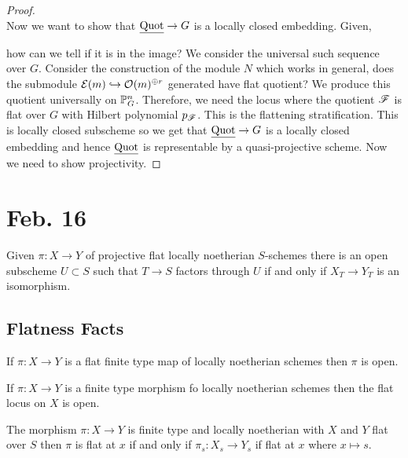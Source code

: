 \documentclass[12pt]{article}
\begin{document}
\begin{proof}
\bigskip\\
Now we want to show that $\uQuot \to G$ is a locally closed embedding. Given,
\begin{center}
\end{center} 
how can we tell if it is in the image? We consider the universal such sequence over $G$. Consider the construction of the module $N$ which works in general, does the submodule $\E(m) \embed \struct{}(m)^{\oplus r}$ generated have flat quotient? We produce this quotient universally on $\P^n_G$. Therefore, we need the locus where the quotient $\F$ is flat over $G$ with Hilbert polynomial $p_\F$. This is the flattening stratification. This is locally closed subscheme so we get that $\uQuot \to G$ is a locally closed embedding and hence $\uQuot$ is representable by a quasi-projective scheme. Now we need to show projectivity. 
\end{proof}

\section{Feb. 16}

\begin{thm}
Given $\pi : X \to Y$ of projective flat locally noetherian $S$-schemes there is an open subscheme $U \subset S$ such that $T \to S$ factors through $U$ if and only if $X_T \to Y_T$ is an isomorphism. 
\end{thm}

\subsection{Flatness Facts}

\begin{prop}
If $\pi : X \to Y$ is a flat finite type map of locally noetherian schemes then $\pi$ is open.
\end{prop}

\begin{prop}
If $\pi : X \to Y$ is a finite type morphism fo locally noetherian schemes then the flat locus on $X$ is open. 
\end{prop}

\begin{prop}
The morphism $\pi : X \to Y$ is finite type and locally noetherian with $X$ and $Y$ flat over $S$ then $\pi$ is flat at $x$ if and only if $\pi_{s} : X_s \to Y_s$ if flat at $x$ where $x \mapsto s$.
\end{prop}
\end{document}

